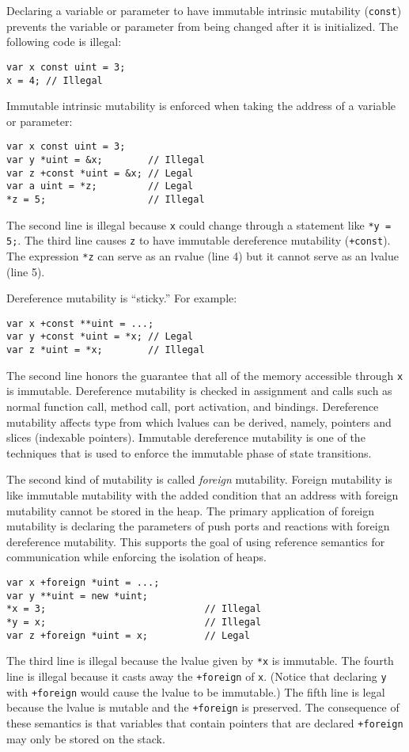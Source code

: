 Declaring a variable or parameter to have immutable intrinsic mutability (\verb+const+) prevents the variable or parameter from being changed after it is initialized.
The following code is illegal:
\begin{verbatim}
var x const uint = 3;
x = 4; // Illegal
\end{verbatim}
Immutable intrinsic mutability is enforced when taking the address of a variable or parameter:
\begin{verbatim}
var x const uint = 3;
var y *uint = &x;        // Illegal
var z +const *uint = &x; // Legal
var a uint = *z;         // Legal
*z = 5;                  // Illegal
\end{verbatim}
The second line is illegal because \verb+x+ could change through a statement like \verb+*y = 5;+.
The third line causes \verb+z+ to have immutable dereference mutability (\verb|+const|).
The expression \verb+*z+ can serve as an rvalue (line 4) but it cannot serve as an lvalue (line 5).

Dereference mutability is ``sticky.''
For example:
\begin{verbatim}
var x +const **uint = ...;
var y +const *uint = *x; // Legal
var z *uint = *x;        // Illegal
\end{verbatim}
The second line honors the guarantee that all of the memory accessible through \verb+x+ is immutable.
Dereference mutability is checked in assignment and calls such as normal function call, method call, port activation, and bindings.
Dereference mutability affects type from which lvalues can be derived, namely, pointers and slices (indexable pointers).
Immutable dereference mutability is one of the techniques that is used to enforce the immutable phase of state transitions.

The second kind of mutability is called \emph{foreign} mutability.
Foreign mutability is like immutable mutability with the added condition that an address with foreign mutability cannot be stored in the heap.
The primary application of foreign mutability is declaring the parameters of push ports and reactions with foreign dereference mutability.
This supports the goal of using reference semantics for communication while enforcing the isolation of heaps.
\begin{verbatim}
var x +foreign *uint = ...;
var y **uint = new *uint;
*x = 3;                            // Illegal
*y = x;                            // Illegal
var z +foreign *uint = x;          // Legal
\end{verbatim}
The third line is illegal because the lvalue given by \verb+*x+ is immutable.
The fourth line is illegal because it casts away the \verb|+foreign| of \verb+x+.
(Notice that declaring \verb+y+ with \verb|+foreign| would cause the lvalue to be immutable.)
The fifth line is legal because the lvalue is mutable and the \verb|+foreign| is preserved.
The consequence of these semantics is that variables that contain pointers that are declared \verb|+foreign| may only be stored on the stack.

